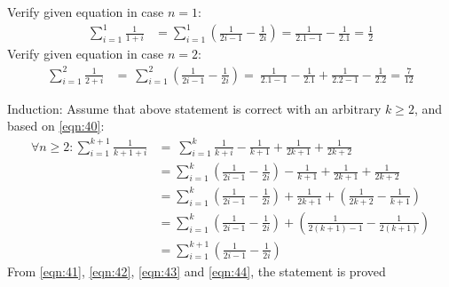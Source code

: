 \begin{enumerate}
    Verify given equation in case $n=1$:
        \begin{align}
            \displaystyle\sum^{1}_{i=1} \frac{1}{1+i} &= \displaystyle\sum^{1}_{i=1} (\frac{1}{2i-1}-\frac{1}{2i}) = \frac{1}{2.1-1}-\frac{1}{2.1} = \frac{1}{2} \label{eqn:42}
        \end{align}
    Verify given equation in case $n=2$:
        \begin{align}
            \displaystyle\sum^{2}_{i=1} \frac{1}{2+i} &=\
            \displaystyle\sum^{2}_{i=1} (\frac{1}{2i-1}-\frac{1}{2i}) =\ 
            \frac{1}{2.1-1}-\frac{1}{2.1} + \frac{1}{2.2-1}-\frac{1}{2.2} = \frac{7}{12} \label{eqn:43}
        \end{align}
    
    Induction: Assume that above statement is correct with an arbitrary $k \geq 2$, and based on \ref{eqn:40}:\\
    \begin{align}
        \forall n\geq 2: \displaystyle\sum^{k+1}_{i=1} \frac{1}{k+1+i} &=\
        \displaystyle\sum^{k}_{i=1} \frac{1}{k+i} -\frac{1}{k+1}+\frac{1}{2k+1}+\frac{1}{2k+2} \\
        &= \displaystyle\sum^{k}_{i=1} (\frac{1}{2i-1}-\frac{1}{2i}) -\frac{1}{k+1}+\frac{1}{2k+1}+\frac{1}{2k+2} \\
        &= \displaystyle\sum^{k}_{i=1} (\frac{1}{2i-1}-\frac{1}{2i}) +\frac{1}{2k+1}+(\frac{1}{2k+2}-\frac{1}{k+1}) \\
        &= \displaystyle\sum^{k}_{i=1} (\frac{1}{2i-1}-\frac{1}{2i}) +(\frac{1}{2(k+1)-1}-\frac{1}{2(k+1)}) \\
        &= \displaystyle\sum^{k+1}_{i=1} (\frac{1}{2i-1}-\frac{1}{2i}) \label{eqn:44}
    \end{align}
    From \ref{eqn:41}, \ref{eqn:42}, \ref{eqn:43} and \ref{eqn:44}, the statement is proved

\end{enumerate}

